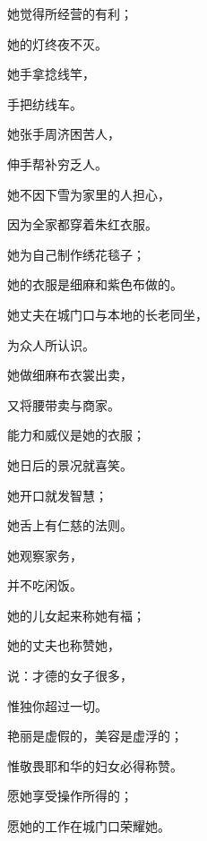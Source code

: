 {\par }{\Q {}她觉得所经营的有利；
\par }{\Q 她的灯终夜不灭。
\par }{\Q {}她手拿捻线竿，
\par }{\Q 手把纺线车。
\par }{\Q {}她张手周济困苦人，
\par }{\Q 伸手帮补穷乏人。
\par }{\Q {}她不因下雪为家里的人担心，
\par }{\Q 因为全家都穿着朱红衣服。
\par }{\Q {}她为自己制作绣花毯子；
\par }{\Q 她的衣服是细麻和紫色布做的。
\par }{\Q {}她丈夫在城门口与本地的长老同坐，
\par }{\Q 为众人所认识。
\par }{\Q {}她做细麻布衣裳出卖，
\par }{\Q 又将腰带卖与商家。
\par }{\Q {}能力和威仪是她的衣服；
\par }{\Q 她{}日后的景况就喜笑。
\par }{\Q {}她开口就发智慧；
\par }{\Q 她舌上有仁慈的法则。
\par }{\Q {}她观察家务，
\par }{\Q 并不吃闲饭。
\par }{\Q {}她的儿女起来称她有福；
\par }{\Q 她的丈夫也称赞她，
\par }{\Q {}说：才德的女子很多，
\par }{\Q 惟独你超过一切。
\par }{\Q {}艳丽是虚假的，美容是虚浮的；
\par }{\Q 惟敬畏耶和华的妇女必得称赞。
\par }{\Q {}愿她享受操作所得的；
\par }{\Q 愿她的工作在城门口荣耀她。
\par }